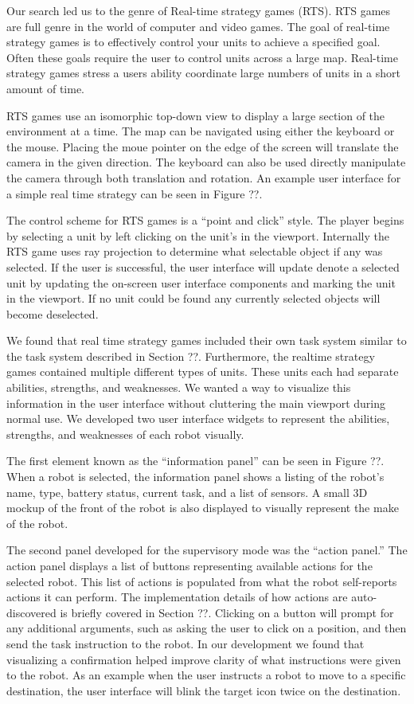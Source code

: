 Our search led us to the genre of Real-time strategy games (RTS). RTS games are full genre in the world of computer and video games. The goal of real-time strategy games is to effectively control your units to achieve a specified goal. Often these goals require the user to control units across a large  map. Real-time strategy games stress a users ability coordinate large numbers of units in a short amount of time. 

RTS games use an isomorphic top-down view to display a large section of the environment at a time. The map can be navigated using either the keyboard or the mouse. Placing the moue pointer on the edge of the screen will translate the camera in the given direction. The keyboard can also be used directly manipulate the camera through both translation and rotation. An example user interface for a simple real time strategy can be seen in Figure ??. 

The control scheme for RTS games is a ``point and click'' style. The player begins by selecting a unit by left clicking on the unit's in the viewport. Internally the RTS game uses ray projection to determine what selectable object if any was selected. If the user is successful, the user interface will update denote a selected unit by updating the on-screen user interface components and marking the unit in the viewport. If no unit could be found any currently selected objects will become deselected.

We found that real time strategy games included their own task system similar to the task system described in Section ??. Furthermore, the realtime strategy games contained multiple different types of units. These units each had separate abilities, strengths, and weaknesses. We wanted a way to visualize this information in the user interface without cluttering the main viewport during normal use. We developed two user interface widgets to represent the abilities, strengths, and weaknesses of each robot visually. 

The first element known as the ``information panel'' can be seen in Figure ??. When a robot is selected, the information panel shows a listing of the robot's name, type, battery status, current task, and a list of sensors. A small 3D mockup of the front of the robot is also displayed to visually represent the make of the robot.

The second panel developed for the supervisory mode was the ``action panel.'' The action panel displays a list of buttons representing available actions for the selected robot. This list of actions is populated from what the robot self-reports actions it can perform. The implementation details of how actions are auto-discovered is briefly covered in Section ??. Clicking on a button will prompt for any additional arguments, such as asking the user to click on a position, and then send the task instruction to the robot. In our development we found that visualizing a confirmation helped improve clarity of what instructions were given to the robot. As an example when the user instructs a robot to move to a specific destination, the user interface will blink the target icon twice on the destination.  

